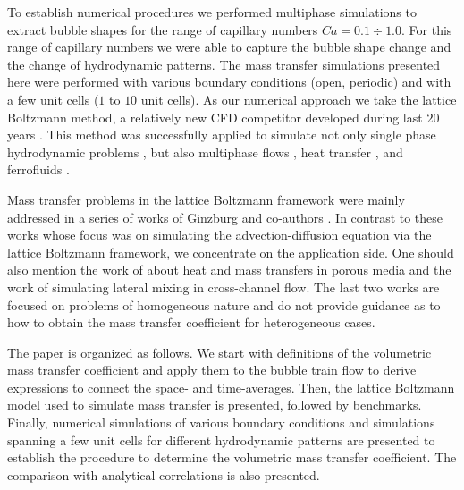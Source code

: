 \documentclass[preprint,12pt]{elsarticle}
\begin{document}
To establish numerical procedures we performed multiphase simulations
to extract bubble shapes
\cite{kuzmin-binary2d,kuzmin-binary3d} for the range of capillary numbers
$Ca=0.1\div 1.0$. For this range of capillary numbers
we were able to capture the bubble shape change and the change of hydrodynamic
patterns. The mass transfer simulations presented here were performed with various boundary
conditions (open, periodic) and with a few unit cells ($1$ to $10$ unit cells).
As our numerical approach we take the lattice Boltzmann method, a relatively
new CFD competitor developed during last $20$ years
\cite{frisch,mcnamara,HJ,HSB}. This method was successfully applied to simulate
not only single phase hydrodynamic problems \cite{yu}, but also multiphase
flows \cite{Shan-chen:extended,swift,gunstensen}, heat transfer
\cite{yuan-thermal,zhang-thermal}, and ferrofluids \cite{dellar-ferro,kuzmin-aniso}.

Mass transfer problems in the lattice Boltzmann framework were mainly
addressed in a series of works of Ginzburg and co-authors
\cite{ginzburg-main,ginzburg-boundary-conditions,ginzburg-saturated-flow}.
In contrast to these works whose focus was on simulating the
advection-diffusion equation via the lattice Boltzmann framework, we concentrate
on the application side.  One should also mention the work of \citet{inamuro-scalar-boundary}
about heat and mass transfers in porous media and the work of
\citet{jos-mass} simulating lateral mixing in cross-channel flow.  The last two
works are focused on problems of homogeneous nature and do not provide
guidance as to how to obtain the mass transfer coefficient for heterogeneous cases.

The paper is organized as follows. We start with definitions of the volumetric mass transfer coefficient and apply them 
to the bubble train flow to derive expressions to connect the space- and time-averages.  Then, the lattice
Boltzmann model used to simulate mass transfer is presented, followed by benchmarks. Finally,
numerical simulations of various boundary conditions and simulations spanning a few unit cells for
different hydrodynamic patterns are presented to establish the procedure to determine the
volumetric mass transfer coefficient. The comparison with analytical correlations is also presented.
\end{document}
